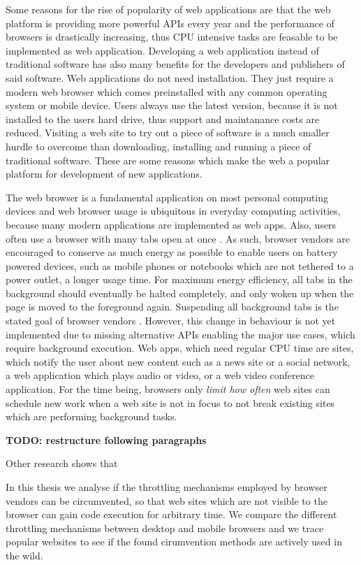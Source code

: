\documentclass[
	ruledheaders=section,%
	class=report,%
	thesis={type=bachelor},%
	accentcolor=9c,%
	custommargins=true,%
	marginpar=false,%
	parskip=half-,%
	fontsize=11pt,%
]{tudapub}
\begin{document}
Some reasons for the rise of popularity of web applications are that the web platform is providing more powerful APIs every year and the performance of browsers is drastically increasing, thus CPU intensive tasks are feasable to be implemented as web application. Developing a web application instead of traditional software has also many benefits for the developers and publishers of said software. Web applications do not need installation. They just require a modern web browser which comes preinstalled with any common operating system or mobile device. Users always use the latest version, because it is not installed to the users hard drive, thus support and maintanance costs are reduced. Visiting a web site to try out a piece of software is a much smaller hurdle to overcome than downloading, installing and running a piece of traditional software. These are some reasons which make the web a popular platform for development of new applications.

The web browser is a fundamental application on most personal computing devices and web browser usage is ubiquitous in everyday computing activities, because many modern applications are implemented as web apps. Also, users often use a browser with many tabs open at once \cite{weinreich2008not}. As such, browser vendors are encouraged to conserve as much energy as possible to enable users on battery powered devices, such as mobile phones or notebooks which are not tethered to a power outlet, a longer usage time. For maximum energy efficiency, all tabs in the background should eventually be halted completely, and only woken up when the page is moved to the foreground again. Suspending all background tabs is the stated goal of browser vendors \cite{chrome-background-tabs-roadmap}. However, this change in behaviour is not yet implemented due to missing alternative APIs enabling the major use cases, which require background execution. Web apps, which need regular CPU time are sites, which notify the user about new content such as a news site or a social network, a web application which plays audio or video, or a web video conference application. For the time being, browsers only \textit{limit how often} web sites can schedule new work when a web site is not in focus to not break existing sites which are performing background tasks.

\textbf{TODO: restructure following paragraphs}

  Other research shows that


  In this thesis we analyse if the throttling mechanisms employed by browser vendors can be circumvented, so that web sites which are not visible to the browser can gain code execution for arbitrary time. We compare the different throttling mechanisms between desktop and mobile browsers and we trace popular websites to see if the found cirumvention methods are actively used in the wild.
\end{document}
